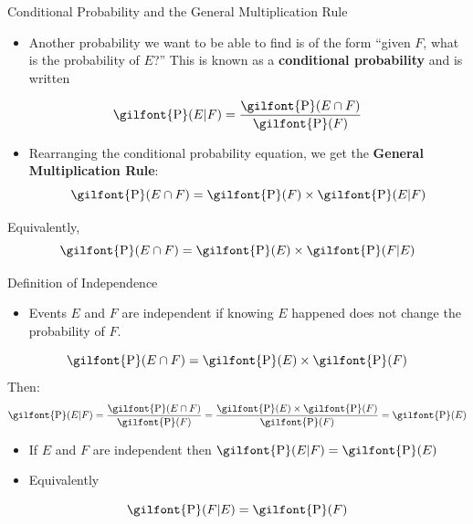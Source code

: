 \documentclass[
  ignorenonframetext,
]{beamer}
\providecommand{\tightlist}{%
  \setlength{\itemsep}{0pt}\setlength{\parskip}{0pt}}
\begin{document}
\begin{frame}{Conditional Probability and the General Multiplication
Rule}
\label{conditional-probability-and-the-general-multiplication-rule}
\begin{itemize}
\tightlist
\item
  Another probability we want to be able to find is of the form ``given
  \(F\), what is the probability of \(E\)?'' This is known as a
  \textbf{conditional probability} and is written
\end{itemize}

\[\textrm{\gilfont{P}}\normalfont (E | F)=\frac{\textrm{\gilfont{P}}\normalfont ( E \cap  F)}{\textrm{\gilfont{P}}\normalfont ( F)}\]

\begin{itemize}
\tightlist
\item
  Rearranging the conditional probability equation, we get the
  \textbf{General Multiplication Rule}:
  \[\textrm{\gilfont{P}}\normalfont ( E \cap  F)=\textrm{\gilfont{P}}\normalfont ( F)\times \textrm{\gilfont{P}}\normalfont ( E| F)\]
\end{itemize}

Equivalently,
\[\textrm{\gilfont{P}}\normalfont (E \cap F)=\textrm{\gilfont{P}}\normalfont (E)\times \textrm{\gilfont{P}}\normalfont (F| E)\]
\end{frame}

\begin{frame}{Definition of Independence}
\label{definition-of-independence}
\begin{itemize}
\tightlist
\item
  Events \(E\) and \(F\) are independent if knowing \(E\) happened does
  not change the probability of \(F\).
\end{itemize}

\[\textrm{\gilfont{P}}\normalfont ( E \cap  F)=\textrm{\gilfont{P}}\normalfont ( E)\times \textrm{\gilfont{P}}\normalfont ( F)\]
Then:
\[\textrm{\gilfont{P}}\normalfont ( E|  F)=\frac{\textrm{\gilfont{P}}\normalfont ( E \cap  F)}{\textrm{\gilfont{P}}\normalfont ( F)}=\frac{\textrm{\gilfont{P}}\normalfont ( E)\times \textrm{\gilfont{P}}\normalfont ( F)}{\textrm{\gilfont{P}}\normalfont ( F)}=\textrm{\gilfont{P}}\normalfont ( E)\]

\begin{itemize}
\item
  If \(E\) and \(F\) are independent then
  \(\textrm{\gilfont{P}}\normalfont ( E|  F)=\textrm{\gilfont{P}}\normalfont ( E)\)
\item
  Equivalently
\end{itemize}

\[\textrm{\gilfont{P}}\normalfont (F|E)=\textrm{\gilfont{P}}\normalfont ( F)\]
\end{frame}
\end{document}

